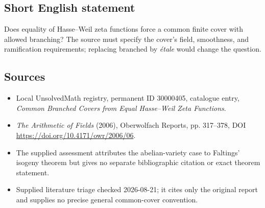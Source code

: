 \documentclass[11pt]{article}
\begin{document}
\subsection{Short English statement}
Does equality of Hasse--Weil zeta functions force a common finite cover with allowed branching? The source must specify the cover's field, smoothness, and ramification requirements; replacing branched by \emph{\'etale} would change the question.
\subsection{Sources}
\begin{itemize}
\item Local UnsolvedMath registry, permanent ID 30000405, catalogue entry, \emph{Common Branched Covers from Equal Hasse--Weil Zeta Functions}.
\item \emph{The Arithmetic of Fields} (2006), Oberwolfach Reports, pp. 317--378, DOI \url{https://doi.org/10.4171/owr/2006/06}.
\item The supplied assessment attributes the abelian-variety case to Faltings' isogeny theorem but gives no separate bibliographic citation or exact theorem statement.
\item Supplied literature triage checked 2026-08-21; it cites only the original report and supplies no precise general common-cover convention.
\end{itemize}
\end{document}
